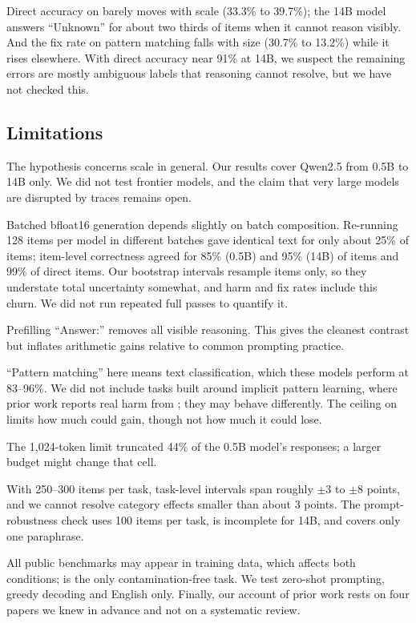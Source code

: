 Direct accuracy on \proofwriter barely moves with scale (33.3\% to 39.7\%); the 14B model answers ``Unknown'' for about two thirds of items when it cannot reason visibly.
And the fix rate on pattern matching falls with size (30.7\% to 13.2\%) while it rises elsewhere.
With direct accuracy near 91\% at 14B, we suspect the remaining errors are mostly ambiguous labels that reasoning cannot resolve, but we have not checked this.

\subsection{Limitations}
\label{sec:limitations}

The hypothesis concerns scale in general. Our results cover Qwen2.5 from 0.5B to 14B only. We did not test frontier models, and the claim that very large models are disrupted by traces remains open.

Batched bfloat16 generation depends slightly on batch composition.
Re-running 128 items per model in different batches gave identical \CoT text for only about 25\% of items; item-level correctness agreed for 85\% (0.5B) and 95\% (14B) of \CoT items and 99\% of direct items.
Our bootstrap intervals resample items only, so they understate total uncertainty somewhat, and harm and fix rates include this churn.
We did not run repeated full passes to quantify it.

Prefilling ``Answer:'' removes all visible reasoning. This gives the cleanest contrast but inflates arithmetic gains relative to common prompting practice.

``Pattern matching'' here means text classification, which these models perform at 83--96\%.
We did not include tasks built around implicit pattern learning, where prior work reports real harm from \CoT \cite{liu2024mind}; they may behave differently.
The ceiling on \sst limits how much \CoT could gain, though not how much it could lose.

The 1,024-token limit truncated 44\% of the 0.5B model's \proofwriter responses; a larger budget might change that cell.

With 250--300 items per task, task-level intervals span roughly $\pm 3$ to $\pm 8$ points, and we cannot resolve category effects smaller than about 3 points.
The prompt-robustness check uses 100 items per task, is incomplete for 14B, and covers only one paraphrase.

All public benchmarks may appear in training data, which affects both conditions; \synth is the only contamination-free task.
We test zero-shot prompting, greedy decoding and English only.
Finally, our account of prior work rests on four papers we knew in advance and not on a systematic review.

